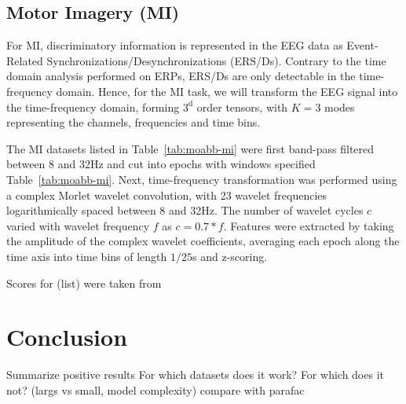 \documentclass[twocolumn]{article}
\begin{document}


\subsection{Motor Imagery (MI)}
For MI, discriminatory information is represented in the EEG data as
Event-Related Synchronizations/Desynchronizations (ERS/Ds).
Contrary to the time domain analysis performed on ERPs, ERS/Ds are only
detectable in the time-frequency domain.
Hence, for the MI task, we will transform the EEG signal into the
time-frequency domain, forming $3^\text{d}$ order tensors, with $K=3$ modes
representing the channels, frequencies and time bins.

The MI datasets listed in Table~\ref{tab:moabb-mi} were first band-pass filtered between 8 and 32Hz and cut into
epochs with windows specified Table~\ref{tab:moabb-mi}.
Next, time-frequency transformation was performed using a complex Morlet wavelet
convolution, with 23 wavelet frequencies logarithmically spaced between 8 and
32Hz.
The number of wavelet cycles $c$ varied with wavelet frequency $f$ as
$c=0.7*f$.
Features were extracted by taking the amplitude of the complex wavelet
coefficients, averaging each epoch along the time axis into time bins of
length $1/25$s and z-scoring.


\begin{table*}
  \footnotesize
  
  \caption{Scores for (list) were taken from \cite{Chevallier2024}}
  \label{tab:mi-score}
\end{table*}

\section{Conclusion}
Summarize positive results
For which datasets does it work? For which does it not? (largs vs small, model
complexity)
compare with parafac
\end{document}
